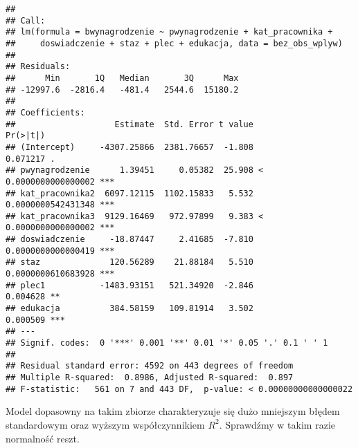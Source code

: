 \documentclass[]{book}
\newenvironment{Shaded}{\begin{snugshade}}{\end{snugshade}}
\newcommand{\KeywordTok}[1]{\textcolor[rgb]{0.13,0.29,0.53}{\textbf{#1}}}
\newcommand{\DataTypeTok}[1]{\textcolor[rgb]{0.13,0.29,0.53}{#1}}
\newcommand{\StringTok}[1]{\textcolor[rgb]{0.31,0.60,0.02}{#1}}
\newcommand{\OperatorTok}[1]{\textcolor[rgb]{0.81,0.36,0.00}{\textbf{#1}}}
\newcommand{\NormalTok}[1]{#1}
\begin{document}
\begin{Shaded}
\end{Shaded}

\begin{verbatim}
## 
## Call:
## lm(formula = bwynagrodzenie ~ pwynagrodzenie + kat_pracownika + 
##     doswiadczenie + staz + plec + edukacja, data = bez_obs_wplyw)
## 
## Residuals:
##      Min       1Q   Median       3Q      Max 
## -12997.6  -2816.4   -481.4   2544.6  15180.2 
## 
## Coefficients:
##                    Estimate  Std. Error t value             Pr(>|t|)    
## (Intercept)     -4307.25866  2381.76657  -1.808             0.071217 .  
## pwynagrodzenie      1.39451     0.05382  25.908 < 0.0000000000000002 ***
## kat_pracownika2  6097.12115  1102.15833   5.532   0.0000000542431348 ***
## kat_pracownika3  9129.16469   972.97899   9.383 < 0.0000000000000002 ***
## doswiadczenie     -18.87447     2.41685  -7.810   0.0000000000000419 ***
## staz              120.56289    21.88184   5.510   0.0000000610683928 ***
## plec1           -1483.93151   521.34920  -2.846             0.004628 ** 
## edukacja          384.58159   109.81914   3.502             0.000509 ***
## ---
## Signif. codes:  0 '***' 0.001 '**' 0.01 '*' 0.05 '.' 0.1 ' ' 1
## 
## Residual standard error: 4592 on 443 degrees of freedom
## Multiple R-squared:  0.8986, Adjusted R-squared:  0.897 
## F-statistic:   561 on 7 and 443 DF,  p-value: < 0.00000000000000022
\end{verbatim}

Model dopasowny na takim zbiorze charakteryzuje się dużo mniejszym
błędem standardowym oraz wyższym współczynnikiem \(R^2\). Sprawdźmy w
takim razie normalność reszt.
\end{document}

